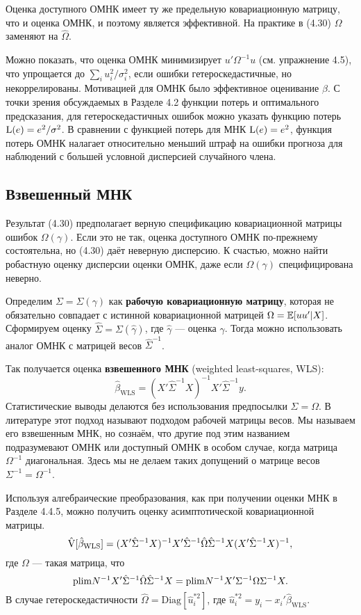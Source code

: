 Оценка доступного ОМНК имеет ту же предельную ковариационную матрицу, что и оценка ОМНК, и поэтому является эффективной. На практике в (4.30)  $\Omega$ заменяют на $\hat{\Omega}$. 

Можно показать, что оценка ОМНК минимизирует $u' \Omega^{-1} u$ (см. упражнение 4.5), что упрощается до $\sum_i u_i^2/\sigma_i^2$, если ошибки гетероскедастичные, но некоррелированы. Мотивацией для ОМНК было эффективное оценивание $\beta$. С точки зрения обсуждаемых в Разделе 4.2 функции потерь и оптимального предсказания, для гетероскедастичных ошибок можно указать функцию потерь $\mathrm{L}(e) = e^2/\sigma^2$. В сравнении с функцией потерь для МНК $\mathrm{L}(e) = e^2$, функция потерь ОМНК налагает относительно меньший штраф на ошибки прогноза для наблюдений с большей условной дисперсией случайного члена. 

\subsection{Взвешенный МНК}

Результат (4.30) предполагает верную спецификацию ковариационной матрицы ошибок $\Omega(\gamma)$. Если это не так, оценка доступного ОМНК по-прежнему состоятельна, но (4.30) даёт неверную дисперсию. К счастью, можно найти робастную оценку дисперсии оценки ОМНК, даже если $\Omega(\gamma)$ специфицирована неверно.

Определим $\Sigma = \Sigma(\gamma)$ как \textbf{рабочую ковариационную матрицу}, которая не обязательно совпадает с истинной ковариационной матрицей $\Omega  = \mathbb{E} [uu'|X]$. Сформируем оценку $\hat{\Sigma} = \Sigma(\hat{\gamma})$, где $\hat{\gamma}$ --- оценка $\gamma$. Тогда можно использовать аналог ОМНК с матрицей весов $\hat{\Sigma}^{-1}$.

Так получается оценка \textbf{взвешенного МНК} (weighted least-squares, WLS):
\begin{equation}
\hat{\beta}_{\text{WLS}} = (X'\hat{\Sigma}^{-1}X)^{-1}X'\hat{\Sigma}^{-1}y.
\end{equation}
Статистические выводы делаются без использования предпосылки $\Sigma = \Omega$.  В литературе этот подход называют подходом рабочей матрицы весов. Мы называем его взвешенным МНК, но сознаём, что другие под этим названием подразумевают ОМНК или доступный ОМНК в особом случае, когда матрица $\Omega ^{-1}$ диагональная. Здесь мы не делаем таких допущений о матрице весов $\Sigma^{-1} = \Omega^{-1}$.

Используя алгебраические преобразования, как при получении оценки МНК в Разделе 4.4.5, можно получить оценку асимптотической ковариационной матрицы. 
\begin{equation}
\hat{\mathrm{V}}[\hat{\beta}_{\text{WLS}}] = (X'\hat{\Sigma}^{-1}X)^{-1}X'\hat{\Sigma}^{-1}\hat{\Omega}\hat{\Sigma}^{-1}X(X'\hat{\Sigma}^{-1}X)^{-1},
\end{equation}
где $\Omega$ --- такая матрица, что
$$
\mathrm{plim } N^{-1} X'\hat{\Sigma}^{-1}\hat{\Omega}\hat{\Sigma}^{-1}X = \mathrm{plim } N^{-1} X'\Sigma^{-1}\Omega\Sigma^{-1}X.
$$
В случае гетероскедастичности $\hat{\Omega} = \mathrm{Diag}[\hat{u}_i^{*2}]$, где $\hat{u}_i^{*2} = y_i - x_i'\hat{\beta}_{\text{WLS}}$.

